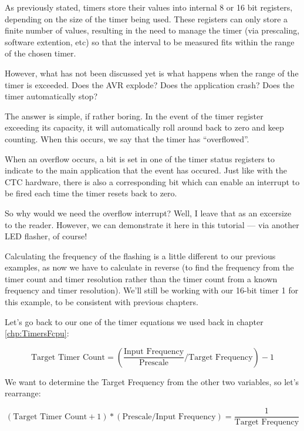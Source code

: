 \documentclass[a4paper,oneside,notitlepage]{book}
\begin{document}
As previously stated, timers store their values into internal 8 or 16 bit registers, depending on the size of the timer being used. These registers can only store a finite number of values, resulting in the need to manage the timer (via prescaling, software extention, etc) so that the interval to be measured fits within the range of the chosen timer.

However, what has not been discussed yet is what happens when the range of the timer is exceeded. Does the AVR explode? Does the application crash? Does the timer automatically stop?

The answer is simple, if rather boring. In the event of the timer register exceeding its capacity, it will automatically roll around back to zero and keep counting. When this occurs, we say that the timer has ``overflowed''.

When an overflow occurs, a bit is set in one of the timer status registers to indicate to the main application that the event has occured. Just like with the CTC hardware, there is also a corresponding bit which can enable an interrupt to be fired each time the timer resets back to zero.

So why would we need the overflow interrupt? Well, I leave that as an excersize to the reader. However, we can demonstrate it here in this tutorial --- via another LED flasher, of course!

Calculating the frequency of the flashing is a little different to our previous examples, as now we have to calculate in reverse (to find the frequency from the timer count and timer resolution rather than the timer count from a known frequency and timer resolution). We'll still be working with our 16-bit timer 1 for this example, to be consistent with previous chapters.

Let's go back to our one of the timer equations we used back in chapter \ref{chp:TimersFcpu}: 

\begin{displaymath}
\text{Target Timer Count} = (\frac{\text{Input Frequency}}{\text{Prescale}} / \text{Target Frequency}) - 1  
\end{displaymath}

We want to determine the Target Frequency from the other two variables, so let's rearrange: 

\begin{displaymath}
(\text{Target Timer Count} + 1) * (\text{Prescale} / \text{Input Frequency}) = \frac{1}{\text{Target Frequency}}
\end{displaymath}
\end{document}
